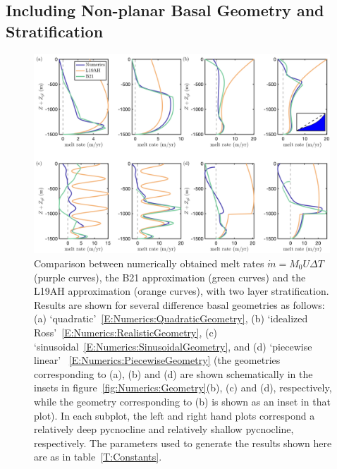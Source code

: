 \documentclass[openacc]{rsproca_new}%
\begin{document}
\subsection{Including Non-planar Basal Geometry and Stratification}
\begin{figure}
\centering
\includegraphics[width = 0.99\textwidth]{Submitted_PRSA/make_plots/plots/figure8.png}
\caption{Comparison between numerically obtained melt rates $\dot{m}= M_0 U \Delta T$ (purple curves), the B21 approximation (green curves) and the L19AH approximation (orange curves), with two layer stratification. Results are shown for several difference basal geometries as follows: (a) `quadratic'~\eqref{E:Numerics:QuadraticGeometry}, (b) `idealized Ross'~\eqref{E:Numerics:RealisticGeometry}, (c) `sinusoidal~\eqref{E:Numerics:SinusoidalGeometry}, and (d) `piecewise linear' ~\eqref{E:Numerics:PiecewiseGeometry} (the geometries corresponding to (a), (b) and (d) are shown schematically in the insets in figure~\ref{fig:Numerics:Geometry}(b), (c) and (d), respectively, while the geometry corresponding to (b) is shown as an inset in that plot). In each subplot, the left and right hand plots correspond a relatively deep pycnocline and relatively shallow pycnocline, respectively.  The parameters used to generate the results shown here are as in table~\ref{T:Constants}. }\label{fig:Numerics:pycnocline_and_geometry_idealized}
\end{figure}
\end{document}
